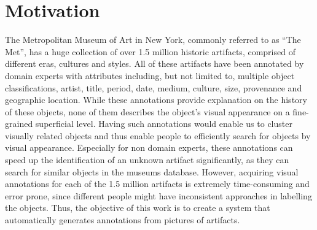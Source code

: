 \section{Motivation}
The Metropolitan Museum of Art in New York, commonly referred to as ``The Met'', has a huge collection of over 1.5 million historic artifacts, comprised of different eras, cultures and styles.
All of these artifacts have been annotated by domain experts with attributes including, but not limited to, multiple object classifications, artist, title, period, date, medium, culture, size, provenance and geographic location.
While these annotations provide explanation on the history of these objects, none of them describes the object's visual appearance on a fine-grained superficial level.
Having such annotations would enable us to cluster visually related objects and thus enable people to efficiently search for objects by visual appearance.
Especially for non domain experts, these annotations can speed up the identification of an unknown artifact significantly, as they can search for similar objects in the museums database.
However, acquiring visual annotations for each of the 1.5 million artifacts is extremely time-consuming and error prone, since different people might have inconsistent approaches in labelling the objects.
Thus, the objective of this work is to create a system that automatically generates annotations from pictures of artifacts.


